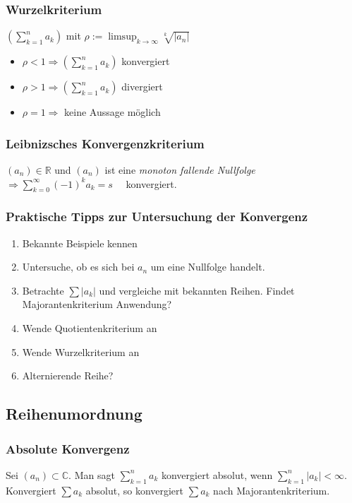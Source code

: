 \documentclass[10pt,a4paper^, twocolumn]{article}
\newcommand{\R}{\mathbb{R}}
\newcommand{\C}{\mathbb{C}}
\begin{document}
		\subsubsection{Wurzelkriterium}
			$(\sum\limits_{k=1}^n a_k)$ mit 
			$\rho := \limsup_{k \to \infty} \sqrt[k]{|a_n|} $
			\begin{itemize}
				\item $\rho < 1 \Rightarrow ( \sum\limits_{k=1}^n a_k)$ konvergiert
				\item $\rho > 1 \Rightarrow ( \sum\limits_{k=1}^n a_k)$ divergiert
				\item $\rho = 1 \Rightarrow $ keine Aussage möglich 
			\end{itemize}
		\subsubsection{Leibnizsches Konvergenzkriterium}
			$(a_n) \in \R$ und $(a_n)$ ist eine \textit{monoton fallende Nullfolge}\\
			$ \Rightarrow \sum\limits_{k=0}^ \infty (-1)^k a_k = s \quad$ konvergiert.
		\subsubsection{Praktische Tipps zur Untersuchung der Konvergenz}
			\begin{enumerate}
			\item Bekannte Beispiele kennen
			\item Untersuche, ob es sich bei $a_n$ um eine Nullfolge handelt.
			\item Betrachte $\sum |a_k|$ und vergleiche mit bekannten Reihen. 
				Findet Majorantenkriterium Anwendung?
			\item Wende Quotientenkriterium an
			\item Wende Wurzelkriterium an
			\item Alternierende Reihe? 
			\end{enumerate}

	\subsection{Reihenumordnung}
		\subsubsection{Absolute Konvergenz}
			Sei $(a_n) \subset \C$.
			Man sagt $\sum\limits_{k=1}^{n} a_k$ konvergiert absolut, wenn 
			$\sum\limits_{k=1}^{n} |a_k| < \infty$. Konvergiert $\sum a_k$ absolut, so 
			konvergiert $\sum a_k$ nach Majorantenkriterium.
\end{document}
